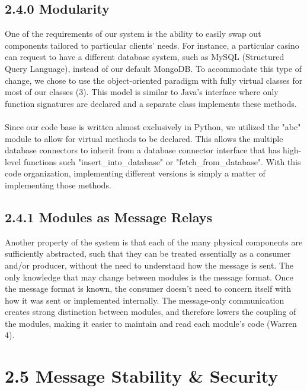 \documentclass[12pt]{report}
\begin{document}
\subsection*{2.4.0 Modularity}
One of the requirements of our system is the ability to easily swap out components tailored to particular clients' needs. For instance, a particular casino can request to have a different database system, such as MySQL (Structured Query Language), instead of our default MongoDB. To accommodate this type of change, we chose to use the object-oriented paradigm with fully virtual classes for most of our classes (3). This model is similar to Java's interface where only function signatures are declared and a separate class implements these methods. \\ \\
Since our code base is written almost exclusively in Python, we utilized the "abc" module to allow for virtual methods to be declared. This allows the multiple database connectors to inherit from a database connector interface that has high-level functions such "insert\_into\_database" or "fetch\_from\_database". With this code organization, implementing different versions is simply a matter of implementing those methods.

\subsection*{2.4.1 Modules as Message Relays}
Another property of the system is that each of the many physical components are sufficiently abstracted, such that they can be treated essentially as a consumer and/or producer, without the need to understand how the message is sent. The only knowledge that may change between modules is the message format. Once the message format is known, the consumer doesn't need to concern itself with how it was sent or implemented internally. The message-only communication creates strong distinction between modules, and therefore lowers the coupling of the modules, making it easier to maintain and read each module's code (Warren 4).

\newpage\thispagestyle{fancy}\sectionfont{\scshape}
\section*{2.5 Message Stability \& Security}
\end{document}
